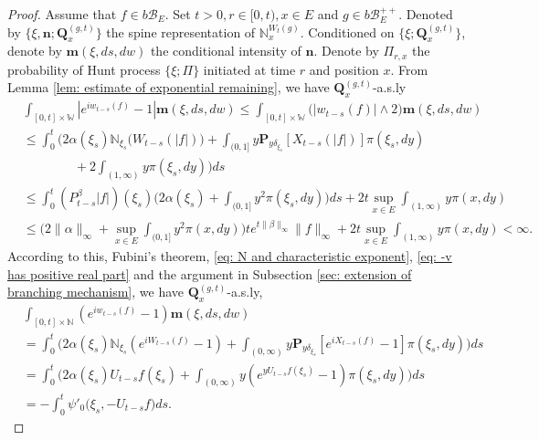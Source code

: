 \documentclass[12pt,oneside,english]{amsart}
\theoremstyle{plain}
\theoremstyle{definition}
\numberwithin{equation}{section}
\begin{document}
\begin{proof}
    Assume that $f\in b\mathscr B_E$.
    Set $t>0, r\in [0,t), x\in E$ and $g\in b\mathscr B_E^{++}$.
    Denoted by $\{\xi, \mathbf n; \mathbf Q_x^{(g,t)}\}$ the spine representation of $\mathbb N_x^{W_t(g)}$.
    Conditioned on $\{\xi; \mathbf Q_x^{(g,t)}\}$, denote by $\mathbf m(\xi, ds,dw)$ the conditional intensity of $\mathbf n$.
    Denote by $\Pi_{r,x}$ the probability of Hunt process $\{\xi; \Pi\}$ initiated at time $r$ and position $x$.
    From Lemma \ref{lem: estimate of exponential remaining}, we have $\mathbf Q^{(g,t)}_{x}$-a.s.ly
\begin{align}
&\int_{[0,t]\times \mathbb W}|e^{i w_{t-s}(f)} - 1| \mathbf m(\xi, ds,dw)
    \leq \int_{[0,t]\times \mathbb W}\big(| w_{t-s}(f)| \wedge 2\big) \mathbf m(\xi, ds,dw)
    \\&\leq \int_0^t \Big(2\alpha(\xi_s)\mathbb N_{\xi_s}\big( W_{t-s}(|f|)\big)  + \int_{(0,1]} y \mathbf P_{y \delta_{\xi_s}}[ X_{t-s}(|f|)] \pi(\xi_s,dy)
    \\&\qquad\qquad+ 2\int_{(1,\infty)}y\pi(\xi_s,dy)\Big) ds
     \\&\leq \int_0^t (P_{t-s}^\beta |f|)(\xi_s)\Big(2\alpha(\xi_s)  + \int_{(0,1]} y^2 \pi(\xi_s,dy)\Big) ds + 2t \sup_{x\in E}\int_{(1,\infty)}y\pi(x,dy)
    \\&\leq \Big(2\|\alpha\|_\infty +\sup_{x\in E}\int_{(0,1]} y^2 \pi(x,dy)\Big) t e^{t\|\beta\|_\infty}\|f\|_\infty + 2t \sup_{x\in E}\int_{(1,\infty)}y\pi(x,dy)
    < \infty.
\end{align}
    According to this, Fubini's theorem, \eqref{eq: N and characteristic exponent}, \eqref{eq: -v has positive real part} and the argument in Subsection \ref{sec: extension of branching mechanism}, we have $\mathbf Q^{(g,t)}_{x}$-a.s.ly,
\begin{align}
    &\int_{[0,t]\times \mathbb N}(e^{i w_{t-s}(f)} - 1) \mathbf m(\xi, ds,dw)
    \\&=\int_0^t \Big(2\alpha(\xi_s)\mathbb N_{\xi_s}(e^{i W_{t-s}(f)} - 1)  + \int_{(0,\infty)} y \mathbf P_{y \delta_{\xi_s}}[e^{i X_{t-s}(f)} - 1] \pi(\xi_s,dy)\Big) ds
    \\&=\int_0^t \Big( 2\alpha(\xi_s) U_{t-s} f(\xi_s) + \int_{(0,\infty)} y (e^{y U_{t-s}f(\xi_s)} - 1) \pi(\xi_s,dy) \Big) ds
    \\&= -\int_0^t \psi'_0 \big(\xi_s, -U_{t-s}f\big)ds.
\end{align}

\end{proof}
\end{document}
